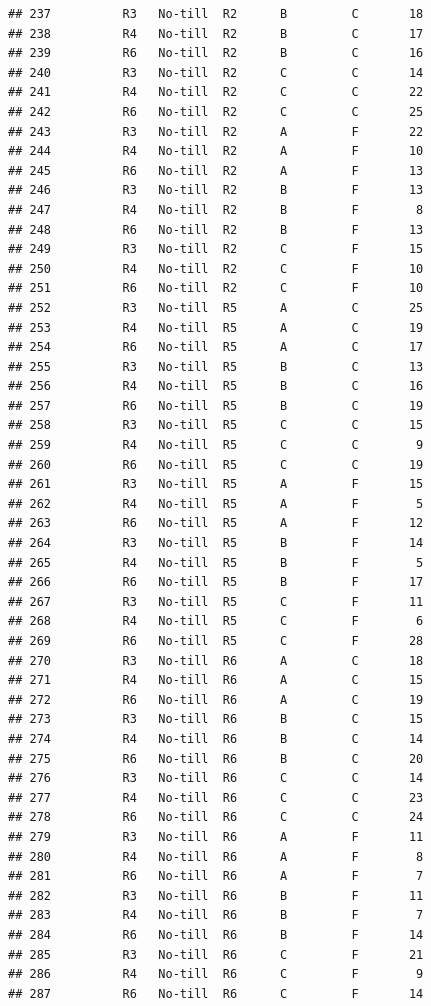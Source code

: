 \documentclass[
]{article}
\begin{document}
\begin{verbatim}
## 237          R3   No-till  R2      B         C       18
## 238          R4   No-till  R2      B         C       17
## 239          R6   No-till  R2      B         C       16
## 240          R3   No-till  R2      C         C       14
## 241          R4   No-till  R2      C         C       22
## 242          R6   No-till  R2      C         C       25
## 243          R3   No-till  R2      A         F       22
## 244          R4   No-till  R2      A         F       10
## 245          R6   No-till  R2      A         F       13
## 246          R3   No-till  R2      B         F       13
## 247          R4   No-till  R2      B         F        8
## 248          R6   No-till  R2      B         F       13
## 249          R3   No-till  R2      C         F       15
## 250          R4   No-till  R2      C         F       10
## 251          R6   No-till  R2      C         F       10
## 252          R3   No-till  R5      A         C       25
## 253          R4   No-till  R5      A         C       19
## 254          R6   No-till  R5      A         C       17
## 255          R3   No-till  R5      B         C       13
## 256          R4   No-till  R5      B         C       16
## 257          R6   No-till  R5      B         C       19
## 258          R3   No-till  R5      C         C       15
## 259          R4   No-till  R5      C         C        9
## 260          R6   No-till  R5      C         C       19
## 261          R3   No-till  R5      A         F       15
## 262          R4   No-till  R5      A         F        5
## 263          R6   No-till  R5      A         F       12
## 264          R3   No-till  R5      B         F       14
## 265          R4   No-till  R5      B         F        5
## 266          R6   No-till  R5      B         F       17
## 267          R3   No-till  R5      C         F       11
## 268          R4   No-till  R5      C         F        6
## 269          R6   No-till  R5      C         F       28
## 270          R3   No-till  R6      A         C       18
## 271          R4   No-till  R6      A         C       15
## 272          R6   No-till  R6      A         C       19
## 273          R3   No-till  R6      B         C       15
## 274          R4   No-till  R6      B         C       14
## 275          R6   No-till  R6      B         C       20
## 276          R3   No-till  R6      C         C       14
## 277          R4   No-till  R6      C         C       23
## 278          R6   No-till  R6      C         C       24
## 279          R3   No-till  R6      A         F       11
## 280          R4   No-till  R6      A         F        8
## 281          R6   No-till  R6      A         F        7
## 282          R3   No-till  R6      B         F       11
## 283          R4   No-till  R6      B         F        7
## 284          R6   No-till  R6      B         F       14
## 285          R3   No-till  R6      C         F       21
## 286          R4   No-till  R6      C         F        9
## 287          R6   No-till  R6      C         F       14
\end{verbatim}
\end{document}
